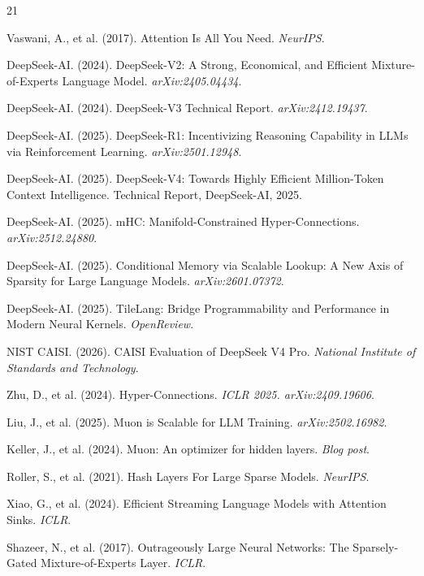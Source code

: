 \documentclass[11pt,a4paper]{article}
\begin{document}
\begin{thebibliography}{21}

Vaswani, A., et al. (2017). Attention Is All You Need. \textit{NeurIPS}.

DeepSeek-AI. (2024). DeepSeek-V2: A Strong, Economical, and Efficient Mixture-of-Experts Language Model. \textit{arXiv:2405.04434}.

DeepSeek-AI. (2024). DeepSeek-V3 Technical Report. \textit{arXiv:2412.19437}.

DeepSeek-AI. (2025). DeepSeek-R1: Incentivizing Reasoning Capability in LLMs via Reinforcement Learning. \textit{arXiv:2501.12948}.

DeepSeek-AI. (2025). DeepSeek-V4: Towards Highly Efficient Million-Token Context Intelligence. Technical Report, DeepSeek-AI, 2025.

DeepSeek-AI. (2025). mHC: Manifold-Constrained Hyper-Connections. \textit{arXiv:2512.24880}.

DeepSeek-AI. (2025). Conditional Memory via Scalable Lookup: A New Axis of Sparsity for Large Language Models. \textit{arXiv:2601.07372}.

DeepSeek-AI. (2025). TileLang: Bridge Programmability and Performance in Modern Neural Kernels. \textit{OpenReview}.

NIST CAISI. (2026). CAISI Evaluation of DeepSeek V4 Pro. \textit{National Institute of Standards and Technology}.

Zhu, D., et al. (2024). Hyper-Connections. \textit{ICLR 2025. arXiv:2409.19606}.

Liu, J., et al. (2025). Muon is Scalable for LLM Training. \textit{arXiv:2502.16982}.

Keller, J., et al. (2024). Muon: An optimizer for hidden layers. \textit{Blog post}.

Roller, S., et al. (2021). Hash Layers For Large Sparse Models. \textit{NeurIPS}.

Xiao, G., et al. (2024). Efficient Streaming Language Models with Attention Sinks. \textit{ICLR}.

Shazeer, N., et al. (2017). Outrageously Large Neural Networks: The Sparsely-Gated Mixture-of-Experts Layer. \textit{ICLR}.


\end{thebibliography}
\end{document}
